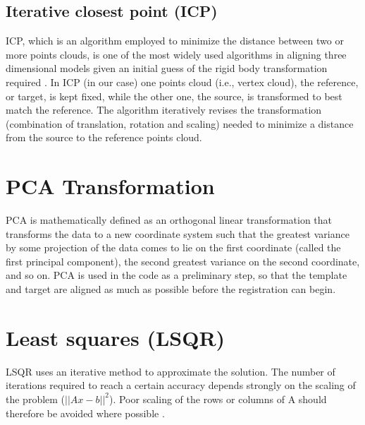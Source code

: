 \documentclass[../structure.tex]{subfiles}
\begin{document}
		\subsection{Iterative closest point (ICP)}
		 ICP, which is an algorithm employed to minimize the distance between two or more points clouds, is one of the most widely used algorithms in aligning three dimensional models given an initial guess of the rigid body transformation required \cite{Zhang1994}.
		 In ICP (in our case) one points cloud (i.e., vertex cloud), the reference, or target, is kept fixed, while the other one, the source, is transformed to best match the reference. The algorithm iteratively revises the transformation (combination of translation, rotation and scaling) needed to minimize a distance from the source to the reference points cloud.
\section{PCA Transformation}
PCA is mathematically defined as an orthogonal linear transformation that transforms the data to a new coordinate system such that the greatest variance by some projection of the data comes to lie on the first coordinate (called the first principal component), the second greatest variance on the second coordinate, and so on\cite{Jolliffe2002}.
PCA is used in the code as a preliminary step, so that the template and target are aligned as much as possible before the registration can begin.
\section{Least squares (LSQR)}
LSQR uses an iterative method to approximate the solution. The number of iterations required to reach a certain accuracy depends strongly on the scaling of the problem ($ ||Ax-b||^2 $). Poor scaling of the rows or columns of A should therefore be avoided where possible \cite{Paige1982}.
\end{document}
